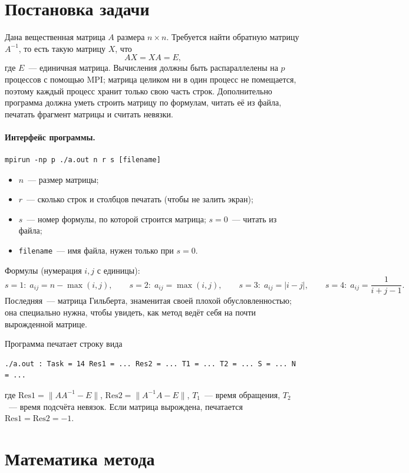 \documentclass[11pt,a4paper]{report}
\begin{document}
\section{Постановка задачи}

Дана вещественная матрица $A$ размера $n\times n$. Требуется найти обратную
матрицу $A^{-1}$, то есть такую матрицу $X$, что
\[
A X = X A = E,
\]
где $E$~--- единичная матрица. Вычисления должны быть распараллелены на $p$
процессов с помощью MPI; матрица целиком ни в один процесс не помещается, поэтому
каждый процесс хранит только свою часть строк. Дополнительно программа должна
уметь строить матрицу по формулам, читать её из файла, печатать фрагмент матрицы
и считать невязки.

\paragraph{Интерфейс программы.}
\begin{lstlisting}[style=c]
mpirun -np p ./a.out n r s [filename]
\end{lstlisting}
\begin{itemize}[nosep]
\item $n$~--- размер матрицы;
\item $r$~--- сколько строк и столбцов печатать (чтобы не залить экран);
\item $s$~--- номер формулы, по которой строится матрица; $s=0$~--- читать из файла;
\item \texttt{filename}~--- имя файла, нужен только при $s=0$.
\end{itemize}

Формулы (нумерация $i,j$ с единицы):
\[
s=1:\; a_{ij}=n-\max(i,j),\qquad
s=2:\; a_{ij}=\max(i,j),\qquad
s=3:\; a_{ij}=|i-j|,\qquad
s=4:\; a_{ij}=\frac{1}{i+j-1}.
\]
Последняя~--- матрица Гильберта, знаменитая своей плохой обусловленностью;
она специально нужна, чтобы увидеть, как метод ведёт себя на почти вырожденной
матрице.

Программа печатает строку вида
\begin{lstlisting}[style=c]
./a.out : Task = 14 Res1 = ... Res2 = ... T1 = ... T2 = ... S = ... N = ...
\end{lstlisting}
где $\mathrm{Res1}=\|AA^{-1}-E\|$, $\mathrm{Res2}=\|A^{-1}A-E\|$, $T_1$~--- время
обращения, $T_2$~--- время подсчёта невязок. Если матрица вырождена, печатается
$\mathrm{Res1}=\mathrm{Res2}=-1$.

\section{Математика метода}
\end{document}
